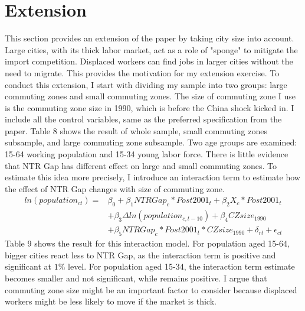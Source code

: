 \documentclass[12pt, final]{CSP}
\begin{document}
\section{Extension}
\noindent
This section provides an extension of the paper by taking city size into account. Large cities, with its thick labor market, act as a role of "sponge" to mitigate the import competition. Displaced workers can find jobs in larger cities without the need to migrate. This provides the motivation for my extension exercise.
\newline
\newline
To conduct this extension, I start with dividing my sample into two groups: large commuting zones and small commuting zones. The size of commuting zone I use is the commuting zone size in 1990, which is before the China shock kicked in. I include all the control variables, same as the preferred specification from the paper.
\newline
\newline
Table 8 shows the result of whole sample, small commuting zones subsample, and large commuting zone subsample. Two age groups are examined: 15-64 working population and 15-34 young labor force. There is little evidence that NTR Gap has different effect on large and small commuting zones. 
\newline
\newline
To estimate this idea more precisely, I introduce an interaction term to estimate how the effect of NTR Gap changes with size of commuting zone.
\newline
\begin{equation}
\begin{split}
ln(population_{ct}) = & \beta_0 + \beta_1 NTR Gap_c * Post2001_t + \beta _2 X_c * Post2001_t  \\
    & + \beta _3 \Delta ln(population_{c,t-10}) + \beta _4 CZsize_{1990} \\
    & + \beta _5 NTR Gap_c * Post2001_t * CZsize_{1990} + \delta _{rt} + \epsilon _{ct}
\end{split}
\end{equation}
\newline
\newline
\noindent
Table 9 shows the result for this interaction model. For population aged 15-64, bigger cities react less to NTR Gap, as the interaction term is positive and significant at $1\%$ level. For population aged 15-34, the interaction term estimate becomes smaller and not significant, while remains positive. I argue that commuting zone size might be an important factor to consider because displaced workers might be less likely to move if the market is thick.
\newline
\newline
\end{document}

